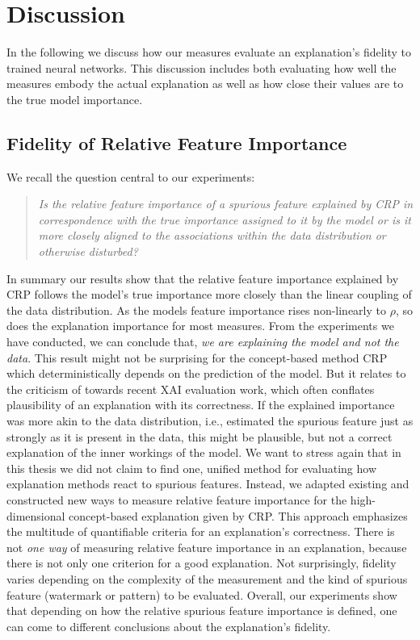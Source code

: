 \chapter{Discussion}\label{chapter:discussion}
In the following we discuss how our measures evaluate an explanation's fidelity to trained neural networks. This discussion includes both evaluating how well the measures embody the actual explanation as well as how close their values are to the true model importance. 

\section{Fidelity of Relative Feature Importance}
We recall the question central to our experiments:
\begin{quote}
    \textit{Is the relative feature importance of a spurious feature explained by CRP in correspondence with the true importance assigned to it by the model or is it more closely aligned to the associations within the data distribution or otherwise disturbed?}
\end{quote}

In summary our results show that the relative feature importance explained by CRP follows the model's true importance more closely than the linear coupling of the data distribution. As the models feature importance rises non-linearly to $\rho$, so does the explanation importance for most measures. From the experiments we have conducted, we can conclude that, \textit{we are explaining the model and not the data}. This result might not be surprising for the concept-based method CRP which deterministically depends on the prediction of the model. But it relates to the criticism of \cite{Nauta2023} towards recent XAI evaluation work, which often conflates plausibility of an explanation with its correctness. If the explained importance was more akin to the data distribution, i.e., estimated the spurious feature just as strongly as it is present in the data, this might be plausible, but not a correct explanation of the inner workings of the model. 
We want to stress again that in this thesis we did not claim to find one, unified method for evaluating how explanation methods react to spurious features. Instead, we adapted existing and constructed new ways to measure relative feature importance for the high-dimensional concept-based explanation given by CRP. This approach emphasizes the multitude of quantifiable criteria for an explanation's correctness. There is not \textit{one way} of measuring relative feature importance in an explanation, because there is not only one criterion for a good explanation. 
Not surprisingly, fidelity varies depending on the complexity of the measurement and the kind of spurious feature (watermark or pattern) to be evaluated. Overall, our experiments show that depending on how the relative spurious feature importance is defined, one can come to different conclusions about the explanation's fidelity. 

